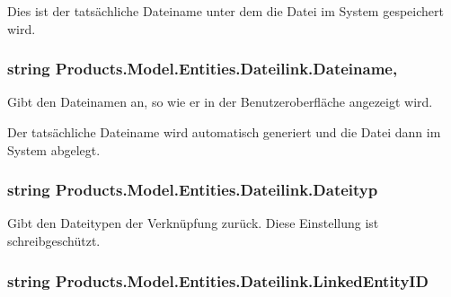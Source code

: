 Dies ist der tatsächliche Dateiname unter dem die Datei im System gespeichert wird. 
\subsubsection[{\texorpdfstring{Dateiname}{Dateiname}}]{\setlength{\rightskip}{0pt plus 5cm}string Products.\+Model.\+Entities.\+Dateilink.\+Dateiname\hspace{0.3cm}{\ttfamily [get]}, {\ttfamily [set]}}\hypertarget{class_products_1_1_model_1_1_entities_1_1_dateilink_a76c3eb7329240e667fb83cff0063deea}{}\label{class_products_1_1_model_1_1_entities_1_1_dateilink_a76c3eb7329240e667fb83cff0063deea}


Gibt den Dateinamen an, so wie er in der Benutzeroberfläche angezeigt wird. 

Der tatsächliche Dateiname wird automatisch generiert und die Datei dann im System abgelegt. 
\subsubsection[{\texorpdfstring{Dateityp}{Dateityp}}]{\setlength{\rightskip}{0pt plus 5cm}string Products.\+Model.\+Entities.\+Dateilink.\+Dateityp\hspace{0.3cm}{\ttfamily [get]}}\hypertarget{class_products_1_1_model_1_1_entities_1_1_dateilink_aca894ef4d365c70fbb095297514ee204}{}\label{class_products_1_1_model_1_1_entities_1_1_dateilink_aca894ef4d365c70fbb095297514ee204}


Gibt den Dateitypen der Verknüpfung zurück. Diese Einstellung ist schreibgeschützt. 

\subsubsection[{\texorpdfstring{Linked\+Entity\+ID}{LinkedEntityID}}]{\setlength{\rightskip}{0pt plus 5cm}string Products.\+Model.\+Entities.\+Dateilink.\+Linked\+Entity\+ID\hspace{0.3cm}{\ttfamily [get]}}\hypertarget{class_products_1_1_model_1_1_entities_1_1_dateilink_a2dadbda9353835b7abc44b06f393f691}{}\label{class_products_1_1_model_1_1_entities_1_1_dateilink_a2dadbda9353835b7abc44b06f393f691}


